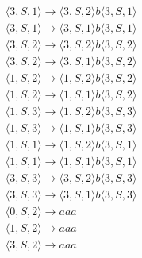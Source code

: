 \documentclass[a4paper,12pt]{article}
\begin{document}
\begin{align*}
&\langle 3, S, 1 \rangle \rightarrow \langle 3, S, 2 \rangle b \langle 3, S, 1 \rangle \\
&\langle 3, S, 1 \rangle \rightarrow \langle 3, S, 1 \rangle b \langle 3, S, 1 \rangle \\
&\langle 3, S, 2 \rangle \rightarrow \langle 3, S, 2 \rangle b \langle 3, S, 2 \rangle \\
&\langle 3, S, 2 \rangle \rightarrow \langle 3, S, 1 \rangle b \langle 3, S, 2 \rangle \\
&\langle 1, S, 2 \rangle \rightarrow \langle 1, S, 2 \rangle b \langle 3, S, 2 \rangle \\
&\langle 1, S, 2 \rangle \rightarrow \langle 1, S, 1 \rangle b \langle 3, S, 2 \rangle \\
&\langle 1, S, 3 \rangle \rightarrow \langle 1, S, 2 \rangle b \langle 3, S, 3 \rangle \\
&\langle 1, S, 3 \rangle \rightarrow \langle 1, S, 1 \rangle b \langle 3, S, 3 \rangle \\
&\langle 1, S, 1 \rangle \rightarrow \langle 1, S, 2 \rangle b \langle 3, S, 1 \rangle \\
&\langle 1, S, 1 \rangle \rightarrow \langle 1, S, 1 \rangle b \langle 3, S, 1 \rangle \\
&\langle 3, S, 3 \rangle \rightarrow \langle 3, S, 2 \rangle b \langle 3, S, 3 \rangle \\
&\langle 3, S, 3 \rangle \rightarrow \langle 3, S, 1 \rangle b \langle 3, S, 3 \rangle \\
&\langle 0, S, 2 \rangle \rightarrow aaa \\
&\langle 1, S, 2 \rangle \rightarrow aaa \\
&\langle 3, S, 2 \rangle \rightarrow aaa
\end{align*}
\end{document}
